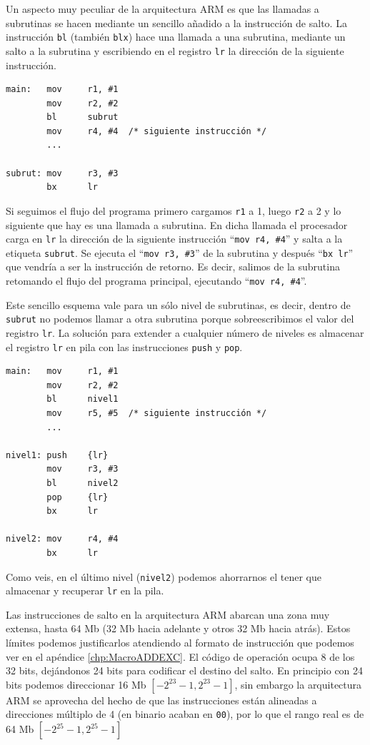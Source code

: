 Un aspecto muy peculiar de la arquitectura ARM es que las llamadas a
subrutinas se hacen mediante un sencillo añadido a la instrucción de salto. La
instrucción {\tt bl} (también {\tt blx}) hace una llamada a una subrutina,
mediante un salto a la subrutina y escribiendo en el registro {\tt lr} la
dirección de la siguiente instrucción.

\begin{lstlisting}
main:   mov     r1, #1
        mov     r2, #2
        bl      subrut
        mov     r4, #4  /* siguiente instrucción */
        ...

subrut: mov     r3, #3
        bx      lr
\end{lstlisting}

Si seguimos el flujo del programa primero cargamos {\tt r1} a 1, luego {\tt r2}
a 2 y lo siguiente que hay es una llamada a subrutina. En dicha llamada el
procesador carga en {\tt lr} la dirección de la siguiente instrucción ``{\tt mov r4, \#4}''
y salta a la etiqueta {\tt subrut}. Se ejecuta el ``{\tt mov r3, \#3}'' de la subrutina
y después ``{\tt bx lr}'' que vendría a ser la instrucción de retorno. Es decir, salimos
de la subrutina retomando el flujo del programa principal, ejecutando ``{\tt mov r4, \#4}''.

Este sencillo esquema vale para un sólo nivel de subrutinas, es decir, dentro de
{\tt subrut} no podemos llamar a otra subrutina porque sobreescribimos el valor del
registro {\tt lr}. La solución para extender a cualquier número de niveles es almacenar
el registro {\tt lr} en pila con las instrucciones {\tt push} y {\tt pop}.

\begin{lstlisting}
main:   mov     r1, #1
        mov     r2, #2
        bl      nivel1
        mov     r5, #5  /* siguiente instrucción */
        ...

nivel1: push    {lr}
        mov     r3, #3
        bl      nivel2
        pop     {lr}
        bx      lr

nivel2: mov     r4, #4
        bx      lr
\end{lstlisting}

Como veis, en el último nivel ({\tt nivel2}) podemos ahorrarnos el tener que
almacenar y recuperar {\tt lr} en la pila.

\vspace{0.25cm}
Las instrucciones de salto en la arquitectura ARM abarcan una zona muy extensa,
hasta 64 Mb (32 Mb hacia adelante y otros 32 Mb hacia atrás). Estos límites podemos
justificarlos atendiendo al formato de instrucción que podemos ver en el apéndice
\ref{chp:MacroADDEXC}. El código de operación ocupa 8 de los 32 bits, dejándonos
24 bits para codificar el destino del salto. En principio con 24 bits podemos
direccionar 16 Mb $[-2^{23}-1, 2^{23}-1]$, sin embargo la arquitectura ARM se aprovecha
del hecho de que las instrucciones están alineadas a direcciones múltiplo de 4 (en binario
acaban en {\tt 00}), por lo que el rango real es de 64 Mb $[-2^{25}-1,2^{25}-1]$

